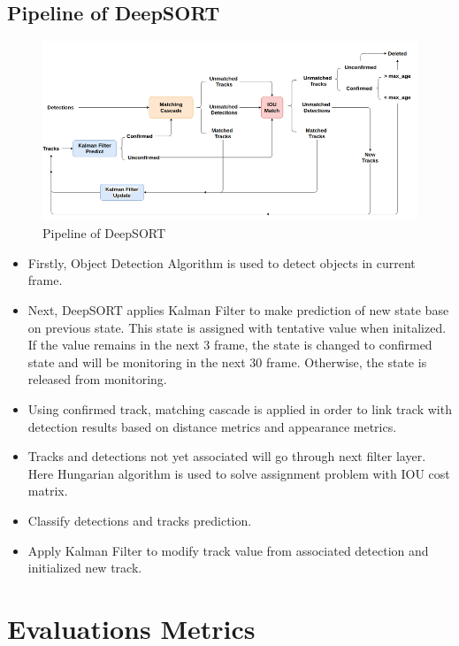     \subsection{Pipeline of DeepSORT}
        \begin{figure}[H]
            \centering
            \includegraphics[width=0.6\linewidth]{img/DeepSort.png}
            \caption{Pipeline of DeepSORT}
        \end{figure}
        \begin{itemize}
            \item Firstly, Object Detection Algorithm is used to detect objects in current frame.
            \item Next, DeepSORT applies Kalman Filter to make prediction of new state base on previous state. This state is assigned with tentative value when initalized. If the value remains in the next 3 frame, the state is changed to confirmed state and will be monitoring in the next 30 frame. Otherwise, the state is released from monitoring.
            \item Using confirmed track, matching cascade is applied in order to link track with detection results based on distance metrics and appearance metrics.
            \item Tracks and detections not yet associated will go through next filter layer. Here Hungarian algorithm is used to solve assignment problem with IOU cost matrix.
            \item Classify detections and tracks prediction.
            \item Apply Kalman Filter to modify track value from associated detection and initialized new track.
        \end{itemize}

\section{Evaluations Metrics}
